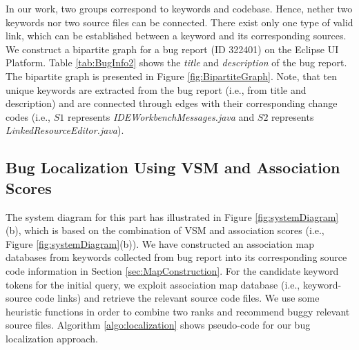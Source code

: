 \documentclass[conference]{IEEEtran}
\begin{document}
In our work, two groups correspond to keywords and codebase. Hence, nether two keywords nor two source files can be connected. There exist only one type of valid link, which can be established between a keyword and its corresponding sources. 
We construct a bipartite graph for a bug report (ID 322401) on the Eclipse UI Platform. Table \ref{tab:BugInfo2} shows the \textit{title} and \textit{description} of the bug report. The bipartite graph is presented in Figure \ref{fig:BipartiteGraph}. Note, that ten unique keywords are extracted from the bug report (i.e., from title and description) and are connected through edges with their corresponding change codes (i.e., $S1$ represents 
\textit{IDEWorkbenchMessages.java} and $S2$ represents 
\textit{LinkedResourceEditor.java}). 
\subsection{Bug Localization Using VSM and Association Scores}

The system diagram for this part has illustrated in Figure \ref{fig:systemDiagram}(b), which 
is based on the combination of VSM and association scores (i.e., Figure \ref{fig:systemDiagram}(b)).
We have constructed an association map databases from keywords collected from bug report into its corresponding source code information in Section \ref{sec:MapConstruction}.
For the candidate keyword tokens for the initial query, we exploit association map database (i.e., keyword-source code links) and retrieve the relevant source code files. We use some heuristic functions in order to combine two ranks and recommend buggy relevant source files. Algorithm \ref{algo:localization} shows pseudo-code for our bug localization approach.
\end{document}
